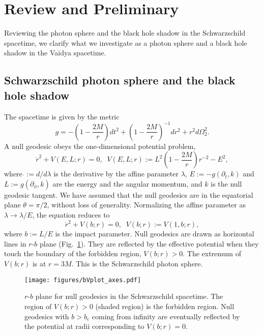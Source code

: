 \documentclass[prd,showpacs,preprintnumbers,groupedaddress,superscriptaddress,nofootinbib,11pt]{revtex4-1} %
\theoremstyle{newplain}
\begin{document}
\afterpage{\clearpage}
\newpage

\section{Review and Preliminary}
\label{sec:review}
Reviewing the photon sphere and the black hole shadow in the Schwarzschild spacetime, we clarify what we investigate as a photon sphere and a black hole shadow in the Vaidya spacetime.
\subsection{Schwarzschild photon sphere and the black hole shadow}
The spacetime is given by the metric
\begin{equation}
g=-\left(1-\frac{2M}{r}\right)dt^2+\left(1-\frac{2M}{r}\right)^{-1}dr^2+r^2d\Omega_2^2.
\end{equation}
A null geodesic obeys the one-dimensional potential problem,
\begin{equation}
\dot{r}^2+V(E,L;r)=0,\;\; V(E,L;r):=L^2\left(1-\frac{2M}{r}\right)r^{-2}-E^2,
\end{equation}
where $\dot{}:=d/d\lambda$ is the derivative by the affine parameter $\lambda$, $E:=-g(\partial_t,k)$ and $L:=g(\partial_\phi,k)$ are the energy and the angular momentum, and $k$ is the null geodesic tangent.
We have assumed that the null geodesics are in the equatorial plane $\theta=\pi/2$, without loss of generality.
Normalizing the affine parameter as $\lambda\to\lambda/E$, the equation reduces to
\begin{equation}
\dot{r}^2+V(b;r)=0,\;\; V(b;r):=V(1,b;r),
\label{eq:effpotential2}
\end{equation}
where $b:=L/E$ is the impact parameter.
Null geodesics are drawn as horizontal lines in $r$-$b$ plane (Fig.~\ref{fig:schwarzschild-potential}).
They are reflected by the effective potential when they touch the boundary of the forbidden region, $V(b;r)>0$.
The extremum of $V(b;r)$ is at $r=3M$.
This is the Schwarzschild photon sphere.
\begin{figure}[h]
\centering
\texttt{[image: figures/bVplot\_axes.pdf]}
\caption{
\label{fig:schwarzschild-potential}
$r$-$b$ plane for null geodesics in the Schwarzschild spacetime.
The region of $V(b;r)>0$ (shaded region) is the forbidden region.
Null geodesics with $b>b_\text{c}$ coming from infinity are eventually reflected by the potential at radii corresponding to $V(b;r)=0$.
}
\end{figure}
\end{document}
